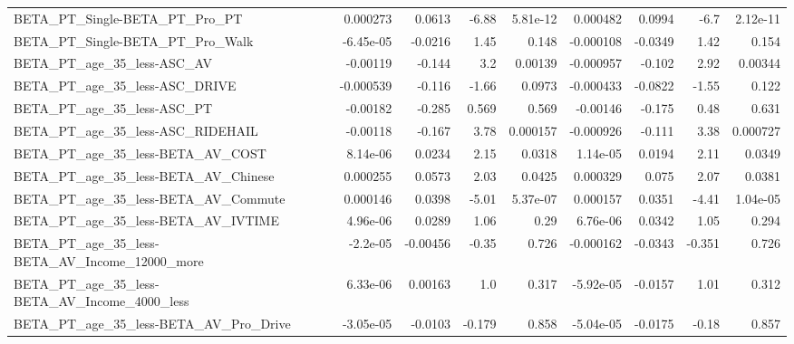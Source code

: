 \begin{tabular}{lrrrrrrrr}
BETA\_PT\_Single-BETA\_PT\_Pro\_PT                      &    0.000273 &       0.0613 &     -6.88 & 5.81e-12 &   0.000482 &      0.0994 &         -6.7 &      2.12e-11 \\
BETA\_PT\_Single-BETA\_PT\_Pro\_Walk                    &   -6.45e-05 &      -0.0216 &      1.45 &    0.148 &  -0.000108 &     -0.0349 &         1.42 &         0.154 \\
BETA\_PT\_age\_35\_less-ASC\_AV                         &    -0.00119 &       -0.144 &       3.2 &  0.00139 &  -0.000957 &      -0.102 &         2.92 &       0.00344 \\
BETA\_PT\_age\_35\_less-ASC\_DRIVE                      &   -0.000539 &       -0.116 &     -1.66 &   0.0973 &  -0.000433 &     -0.0822 &        -1.55 &         0.122 \\
BETA\_PT\_age\_35\_less-ASC\_PT                         &    -0.00182 &       -0.285 &     0.569 &    0.569 &   -0.00146 &      -0.175 &         0.48 &         0.631 \\
BETA\_PT\_age\_35\_less-ASC\_RIDEHAIL                   &    -0.00118 &       -0.167 &      3.78 & 0.000157 &  -0.000926 &      -0.111 &         3.38 &      0.000727 \\
BETA\_PT\_age\_35\_less-BETA\_AV\_COST                   &    8.14e-06 &       0.0234 &      2.15 &   0.0318 &   1.14e-05 &      0.0194 &         2.11 &        0.0349 \\
BETA\_PT\_age\_35\_less-BETA\_AV\_Chinese                &    0.000255 &       0.0573 &      2.03 &   0.0425 &   0.000329 &       0.075 &         2.07 &        0.0381 \\
BETA\_PT\_age\_35\_less-BETA\_AV\_Commute                &    0.000146 &       0.0398 &     -5.01 & 5.37e-07 &   0.000157 &      0.0351 &        -4.41 &      1.04e-05 \\
BETA\_PT\_age\_35\_less-BETA\_AV\_IVTIME                 &    4.96e-06 &       0.0289 &      1.06 &     0.29 &   6.76e-06 &      0.0342 &         1.05 &         0.294 \\
BETA\_PT\_age\_35\_less-BETA\_AV\_Income\_12000\_more      &    -2.2e-05 &     -0.00456 &     -0.35 &    0.726 &  -0.000162 &     -0.0343 &       -0.351 &         0.726 \\
BETA\_PT\_age\_35\_less-BETA\_AV\_Income\_4000\_less       &    6.33e-06 &      0.00163 &       1.0 &    0.317 &  -5.92e-05 &     -0.0157 &         1.01 &         0.312 \\
BETA\_PT\_age\_35\_less-BETA\_AV\_Pro\_Drive              &   -3.05e-05 &      -0.0103 &    -0.179 &    0.858 &  -5.04e-05 &     -0.0175 &        -0.18 &         0.857 \\

\end{tabular}

